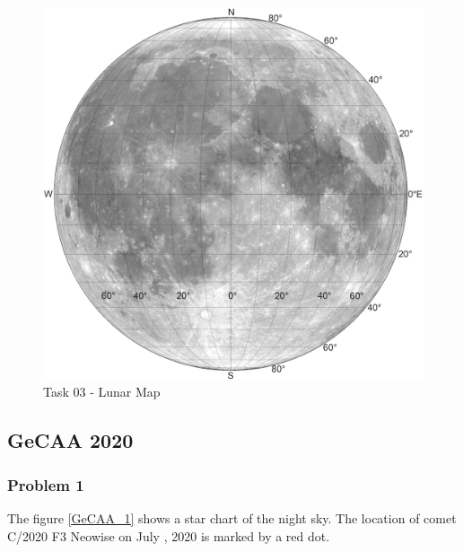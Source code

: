 \documentclass[a4paper,12pt]{extarticle}
\begin{document}
\begin{figure}[H]
	\centering
	\includegraphics[width=0.95\linewidth]{moon3.png}
	\caption{Task 03 - Lunar Map}
\end{figure}

\subsection{GeCAA 2020}
\subsubsection{Problem 1}
The figure \ref{GeCAA_1} shows a star chart of the night sky. The location of comet C/2020 F3 Neowise on July , 2020 is marked by a red dot.
\end{document}
